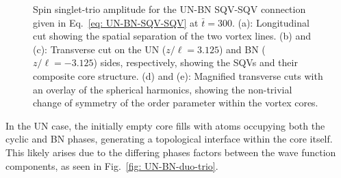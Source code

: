 \begin{figure}
    \caption[Dynamics of a singly quantised vortex connection across a uniaxial
        nematic to biaxial nematic interface]
    {\label{fig: UN-BN-SQV-SQV-singlets}Spin singlet-trio amplitude for
        the UN-BN SQV-SQV connection given in Eq.~\eqref{eq: UN-BN-SQV-SQV} at
        \(\bar{t} = 300\).
        (a): Longitudinal cut showing the spatial separation of the two vortex
        lines.
        (b) and (c): Transverse cut on the UN (\(z/\ell = 3.125\)) and BN
        (\(z/\ell = -3.125\)) sides, respectively, showing the SQVs and their
        composite core structure.
        (d) and (e): Magnified transverse cuts with an overlay of the spherical
        harmonics, showing the non-trivial change of symmetry of the order
        parameter within the vortex cores.}
\end{figure}
In the UN case, the initially empty core fills with atoms occupying both the
cyclic and BN phases, generating a topological interface within the core itself.
This likely arises due to the differing phases factors between the wave function
components, as seen in Fig.~\ref{fig: UN-BN-duo-trio}.

